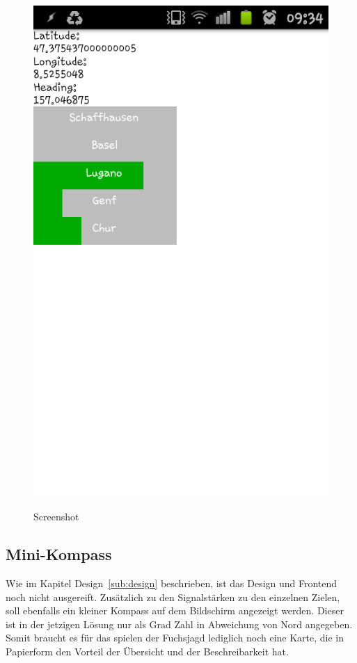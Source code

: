 \begin{figure}[H]
	\centering			      
        \includegraphics[scale=0.50, trim=0mm 15cm 0mm 0mm, clip]{images/screenshot-1.png}\\
		\caption{Screenshot}
	\label{fig:screenshot-1}
\end{figure}

\subsection{Mini-Kompass} %
\label{sub:mini_kompass}
Wie im Kapitel Design~\ref{sub:design} beschrieben, ist das Design und Frontend noch nicht ausgereift. Zusätzlich zu den Signalstärken zu den einzelnen Zielen, soll ebenfalls ein kleiner Kompass auf dem Bildschirm angezeigt werden. Dieser ist in der jetzigen Lösung nur als Grad Zahl in Abweichung von Nord angegeben. Somit braucht es für das spielen der Fuchsjagd lediglich noch eine Karte, die in Papierform den Vorteil der Übersicht und der Beschreibarkeit hat.

